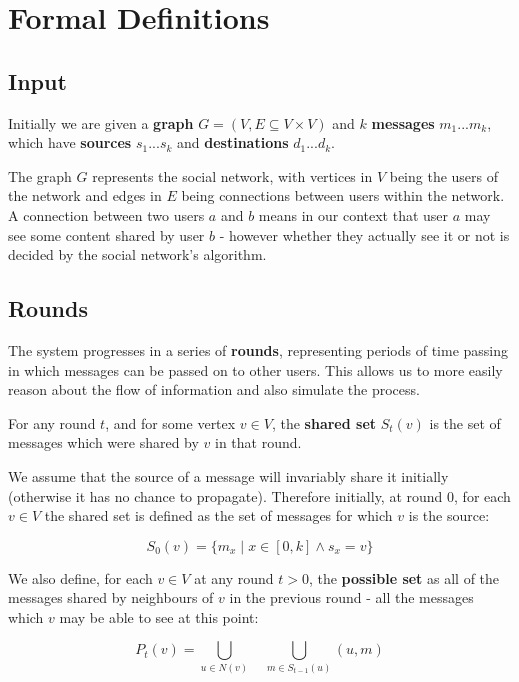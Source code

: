\documentclass[bsc,frontabs,twoside,singlespacing,parskip,deptreport]{infthesis}     %
\begin{document}
\section{Formal Definitions}

\subsection{Input}
Initially we are given a \textbf{graph} $G = (V, E \subseteq V \times V)$ and $k$ \textbf{messages} $ m_{1} ... m_{k}$, which have \textbf{sources} $s_{1} ... s_{k}$ and \textbf{destinations} $d_{1} ... d_{k}$. 

The graph $G$ represents the social network, with vertices in $V$ being the users of the network and edges in $E$ being connections between users within the network. A connection between two users $a$ and $b$ means in our context that user $a$ may see some content shared by user $b$ - however whether they actually see it or not is decided by the social network's algorithm.

\subsection{Rounds}
The system progresses in a series of \textbf{rounds}, representing periods of time passing in which messages can be passed on to other users. This allows us to more easily reason about the flow of information and also simulate the process.

For any round $t$, and for some vertex $v \in V$, the \textbf{shared set} $S_{t}(v)$ is the set of messages which were shared by $v$ in that round.

We assume that the source of a message will invariably share it initially (otherwise it has no chance to propagate). Therefore initially, at round 0, for each $v \in V$ the shared set is defined as the set of messages for which $v$ is the source:

\begin{equation}
S_{0}(v) = \{m_{x} \; | \; x \in [0, k] \wedge s_{x} = v\}
\end{equation}


We also define, for each $v \in V$ at any round $t > 0$, the \textbf{possible set} as all of the messages shared by neighbours of $v$ in the previous round - all the messages which $v$ may be able to see at this point:

\begin{equation}
P_{t}(v) = \bigcup_{u \in N(v)} \quad \bigcup_{m \in S_{t-1}(u)} (u, m)
\end{equation}
\end{document}

